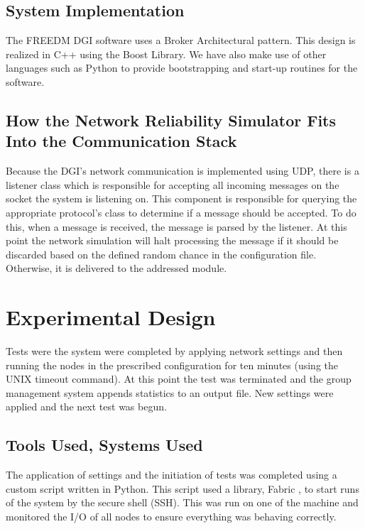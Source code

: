 \documentclass{llncs}
\begin{document}
\subsection{System Implementation}

The FREEDM DGI software uses a Broker Architectural pattern. This design is realized in C++ using the Boost Library\cite{BOOST}. We have also make use of other languages such as Python to provide bootstrapping and start-up routines for the software.

\subsection{How the Network Reliability Simulator Fits Into the Communication Stack}

Because the DGI's network communication is implemented using UDP, there is a listener class which is responsible for accepting all incoming messages on the socket the system is listening on. This component is responsible for querying the appropriate protocol's class to determine
if a message should be accepted. To do this, when a message is received, the message is parsed by the listener. At this point the network simulation will halt processing the  message if it should be discarded based on the defined random chance in the configuration file. Otherwise, it is delivered to the addressed module.

\section{Experimental Design}

Tests were the system were completed by applying network settings and then running the nodes in the prescribed configuration for ten minutes (using the UNIX timeout command). At this point the test was terminated and the group management system appends statistics to an output file. New settings were applied and the next test was begun.

\subsection{Tools Used, Systems Used}

The application of settings and the initiation of tests was completed using a custom script written in Python. This script used a library, Fabric \cite{FABRIC}, to start runs of the system by the secure shell (SSH). This was run on one of the machine and monitored the I/O of all nodes to ensure everything was behaving correctly.
\end{document}
